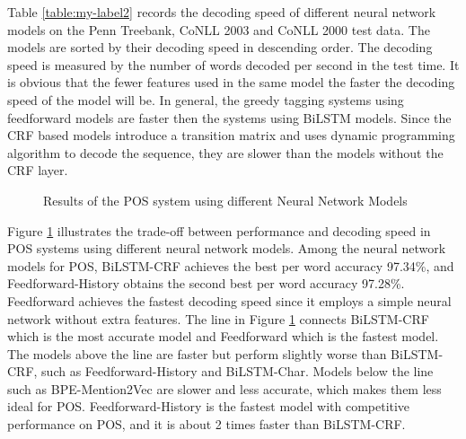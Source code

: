 Table \ref{table:my-label2} records the decoding speed of different neural network models on the Penn Treebank, CoNLL 2003 and CoNLL 2000 test data. The models are sorted by their decoding speed in descending order. The decoding speed is measured by the number of words decoded per second in the test time. It is obvious that the fewer features used in the same model the faster the decoding speed of the model will be. In general, the greedy tagging systems using feedforward models are faster then the systems using BiLSTM models. Since the CRF based models introduce a transition matrix and uses dynamic programming algorithm to decode the sequence, they are slower than the models without the CRF layer.


\begin{figure}[h]
\centering
 \caption{Results of the POS system using different Neural Network Models}
  \label{fig:pos}
\end{figure}

Figure \ref{fig:pos} illustrates the trade-off between performance and decoding speed in POS systems using different neural network models. Among the neural network models for POS, BiLSTM-CRF achieves the best per word accuracy 97.34\%, and Feedforward-History obtains the second best per word accuracy 97.28\%. Feedforward achieves the fastest decoding speed since it employs a simple neural network without extra features. The line in Figure \ref{fig:pos} connects BiLSTM-CRF which is the most accurate model and Feedforward which is the fastest model. The models above the line are faster but perform slightly worse than BiLSTM-CRF, such as Feedforward-History and BiLSTM-Char. Models below the line such as BPE-Mention2Vec are slower and less accurate, which makes them less ideal for POS. Feedforward-History is the fastest model with competitive performance on POS, and it is about 2 times faster than BiLSTM-CRF.

